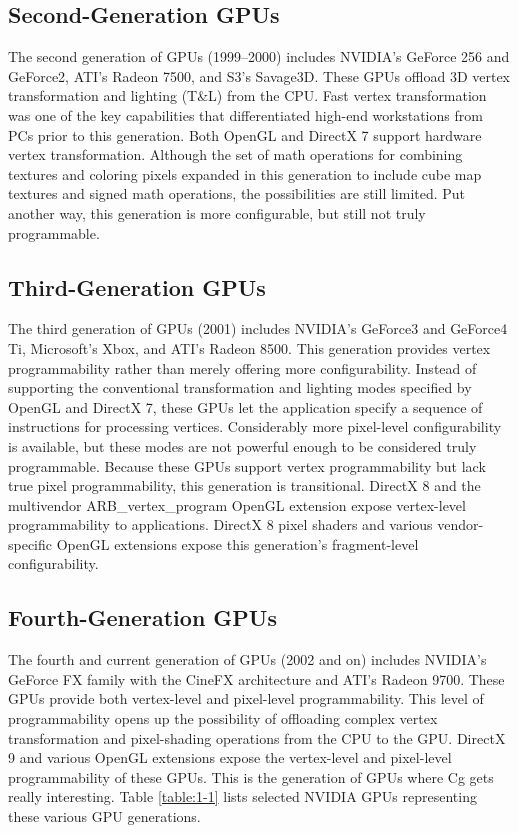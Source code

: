 \documentclass{book}
\begin{document}
\subsection*{Second-Generation GPUs}

The second generation of GPUs (1999–2000) includes NVIDIA's GeForce 256 and GeForce2, ATI's Radeon 7500, and S3's Savage3D. These GPUs offload 3D vertex transformation and lighting (T\&L) from the CPU. Fast vertex transformation was one of the key capabilities that differentiated high-end workstations from PCs prior to this generation. Both OpenGL and DirectX 7 support hardware vertex transformation. Although the set of math operations for combining textures and coloring pixels expanded in this generation to include cube map textures and signed math operations, the possibilities are still limited. Put another way, this generation is more configurable, but still not truly programmable.

\subsection*{Third-Generation GPUs}

The third generation of GPUs (2001) includes NVIDIA's GeForce3 and GeForce4 Ti, Microsoft's Xbox, and ATI's Radeon 8500. This generation provides vertex programmability rather than merely offering more configurability. Instead of supporting the conventional transformation and lighting modes specified by OpenGL and DirectX 7, these GPUs let the application specify a sequence of instructions for processing vertices. Considerably more pixel-level configurability is available, but these modes are not powerful enough to be considered truly programmable. Because these GPUs support vertex programmability but lack true pixel programmability, this generation is transitional. DirectX 8 and the multivendor ARB\_vertex\_program OpenGL extension expose vertex-level programmability to applications. DirectX 8 pixel shaders and various vendor-specific OpenGL extensions expose this generation's fragment-level configurability.

\subsection*{Fourth-Generation GPUs}

The fourth and current generation of GPUs (2002 and on) includes NVIDIA's GeForce FX family with the CineFX architecture and ATI's Radeon 9700. These GPUs provide both vertex-level and pixel-level programmability. This level of programmability opens up the possibility of offloading complex vertex transformation and pixel-shading operations from the CPU to the GPU. DirectX 9 and various OpenGL extensions expose the vertex-level and pixel-level programmability of these GPUs. This is the generation of GPUs where Cg gets really interesting. Table \ref{table:1-1} lists selected NVIDIA GPUs representing these various GPU generations.
\end{document}
